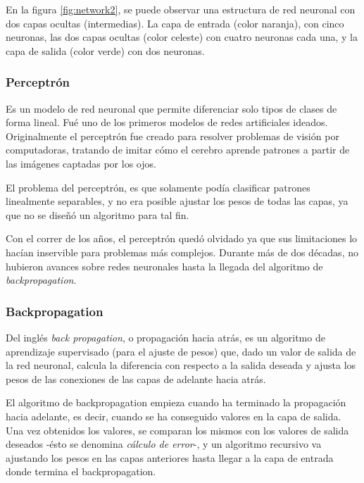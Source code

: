\documentclass[a4paper,12pt,oneside,spanish]{book}
\begin{document}
En la figura \ref{fig:network2}, se puede observar una estructura de red neuronal con dos capas ocultas (intermedias). La capa de entrada (color naranja), con cinco neuronas, las dos capas ocultas (color celeste) con cuatro neuronas cada una, y la capa de salida (color verde) con dos neuronas.\par

\subsubsection{Perceptrón}
Es un modelo de red neuronal que permite diferenciar solo tipos de clases de forma lineal. Fué uno de los primeros modelos de redes artificiales ideados. Originalmente el perceptrón fue creado para resolver problemas de visión por computadoras, tratando de imitar cómo el cerebro aprende patrones a partir de las imágenes captadas por los ojos.\par

El problema del perceptrón, es que solamente podía clasificar patrones linealmente separables, y no era posible ajustar los pesos de todas las capas, ya que no se diseñó un algoritmo para tal fin.\par

Con el correr de los años, el perceptrón quedó olvidado ya que sus limitaciones lo hacían inservible para problemas más complejos. Durante más de dos décadas, no hubieron avances sobre redes neuronales hasta la llegada del algoritmo de \textit{backpropagation}.\par

\subsubsection{Backpropagation}
Del inglés \textit{back propagation}, o propagación hacia atrás, es un algoritmo de aprendizaje supervisado (para el ajuste de pesos) que, dado un valor de salida de la red neuronal, calcula la diferencia con respecto a la salida deseada y ajusta los pesos de las conexiones de las capas de adelante hacia atrás.\par

El algoritmo de backpropagation empieza cuando ha terminado la propagación hacia adelante, es decir, cuando se ha conseguido valores en la capa de salida. Una vez obtenidos los valores, se comparan los mismos con los valores de salida deseados -ésto se denomina \textit{cálculo de error}-, y un algoritmo recursivo va ajustando los pesos en las capas anteriores hasta llegar a la capa de entrada donde termina el backpropagation.\par
\end{document}
